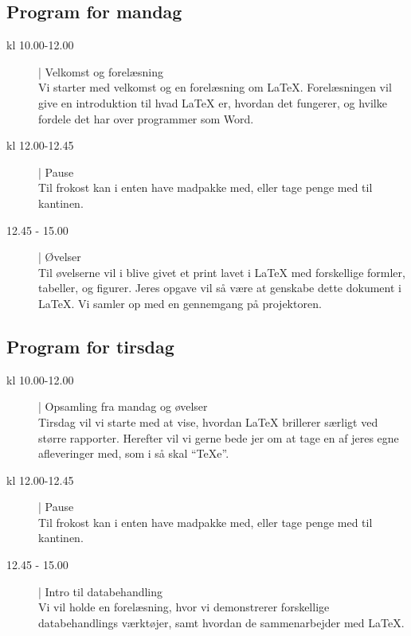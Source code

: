 \documentclass{article}                                                        %
\begin{document}
    \subsection{Program for mandag}
    \begin{description}
        \item[kl 10.00-12.00] | Velkomst og forelæsning ~ \\
        Vi starter med velkomst og en forelæsning om LaTeX.
        Forelæsningen vil give en introduktion til hvad LaTeX er, hvordan det
        fungerer, og hvilke fordele det har over programmer som Word.

        \item[kl 12.00-12.45] | Pause ~ \\
        Til frokost kan i enten have madpakke med, eller tage penge med til
        kantinen.

        \item[12.45 - 15.00] | Øvelser ~ \\
        Til øvelserne vil i blive givet et print lavet i LaTeX med forskellige
        formler, tabeller, og figurer. Jeres opgave vil så være at genskabe
        dette dokument i LaTeX. Vi samler op med en gennemgang på projektoren.
    \end{description}

    \subsection{Program for tirsdag}
    \begin{description}
        \item[kl 10.00-12.00] | Opsamling fra mandag og øvelser ~ \\
        Tirsdag vil vi starte med at vise, hvordan LaTeX brillerer særligt
        ved større rapporter. Herefter vil vi gerne bede jer om at tage en af
        jeres egne afleveringer med, som i så skal ``TeXe''.

        \item[kl 12.00-12.45] | Pause ~ \\
        Til frokost kan i enten have madpakke med, eller tage penge med til
        kantinen.

        \item[12.45 - 15.00] | Intro til databehandling ~ \\
        Vi vil holde en forelæsning, hvor vi demonstrerer forskellige
        databehandlings værktøjer, samt hvordan de sammenarbejder med LaTeX.
    \end{description}
\end{document}
